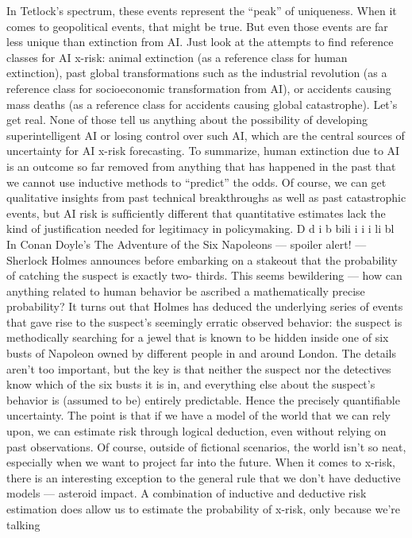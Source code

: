 In Tetlock’s spectrum, these events represent the “peak” of
uniqueness. When it comes to geopolitical events, that might be true.
But even those events are far less unique than extinction from AI.
Just look at the attempts to ﬁnd reference classes for AI x-risk:
animal extinction (as a reference class for human extinction), past
global transformations such as the industrial revolution (as a
reference class for socioeconomic transformation from AI), or
accidents causing mass deaths (as a reference class for accidents
causing global catastrophe). Let’s get real. None of those tell us
anything about the possibility of developing superintelligent AI or
losing control over such AI, which are the central sources of
uncertainty for AI x-risk forecasting.
To summarize, human extinction due to AI is an outcome so far
removed from anything that has happened in the past that we cannot
use inductive methods to “predict” the odds. Of course, we can get
qualitative insights from past technical breakthroughs as well as past
catastrophic events, but AI risk is sufﬁciently different that
quantitative estimates lack the kind of justiﬁcation needed for
legitimacy in policymaking.
D d
i
b bili
i
i
i
li bl
In Conan Doyle’s The Adventure of the Six Napoleons — spoiler
alert! — Sherlock Holmes announces before embarking on a
stakeout that the probability of catching the suspect is exactly two-
thirds. This seems bewildering — how can anything related to human
behavior be ascribed a mathematically precise probability?
It turns out that Holmes has deduced the underlying series of events
that gave rise to the suspect’s seemingly erratic observed behavior:
the suspect is methodically searching for a jewel that is known to be
hidden inside one of six busts of Napoleon owned by different people
in and around London. The details aren’t too important, but the key is
that neither the suspect nor the detectives know which of the six
busts it is in, and everything else about the suspect’s behavior is
(assumed to be) entirely predictable. Hence the precisely quantiﬁable
uncertainty.
The point is that if we have a model of the world that we can rely
upon, we can estimate risk through logical deduction, even without
relying on past observations. Of course, outside of ﬁctional scenarios,
the world isn’t so neat, especially when we want to project far into the
future.
When it comes to x-risk, there is an interesting exception to the
general rule that we don’t have deductive models — asteroid impact.
A combination of inductive and deductive risk estimation does allow
us to estimate the probability of x-risk, only because we’re talking
